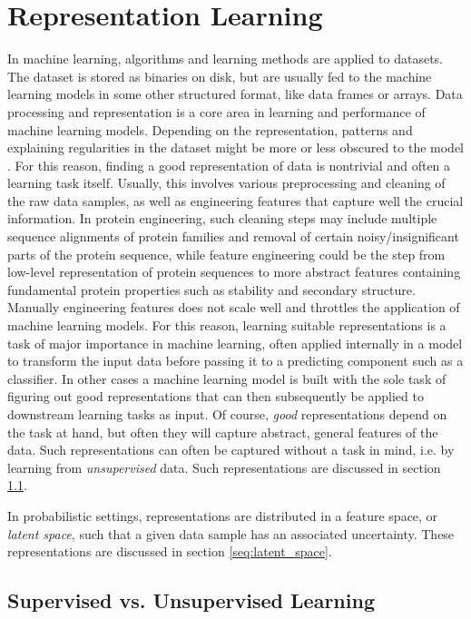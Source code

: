 \chapter{Representation Learning}
In machine learning, algorithms and learning methods are applied to datasets. The dataset is stored as binaries on disk, but are usually fed to the machine learning models in some other structured format, like data frames or arrays. Data processing and representation is a core area in learning and performance of machine learning models. Depending on the representation, patterns and explaining regularities in the dataset might be more or less obscured to the model \cite{bengio2013representation}. For this reason, finding a good representation of data is nontrivial and often a learning task itself. Usually, this involves various preprocessing and cleaning of the raw data samples, as well as engineering features that capture well the crucial information. In protein engineering, such cleaning steps may include multiple sequence alignments of protein families and removal of certain noisy/insignificant parts of the protein sequence, while feature engineering could be the step from low-level representation of protein sequences to more abstract features containing fundamental protein properties such as stability and secondary structure. Manually engineering features does not scale well and throttles the application of machine learning models. For this reason, learning suitable representations is a task of major importance in machine learning, often applied internally in a model to transform the input data before passing it to a predicting component such as a classifier. In other cases a machine learning model is built with the sole task of figuring out good representations that can then subsequently be applied to downstream learning tasks as input. Of course, \textit{good} representations depend on the task at hand, but often they will capture abstract, general features of the data. Such representations can often be captured without a task in mind, i.e. by learning from \textit{unsupervised} data. Such representations are discussed in section \ref{sec:supervised_vs_unsupervised}. 

In probabilistic settings, representations are distributed in a feature space, or \textit{latent space}, such that a given data sample has an associated uncertainty. These representations are discussed in section \ref{seq:latent_space}.

\section{Supervised vs. Unsupervised Learning}
\label{sec:supervised_vs_unsupervised}


